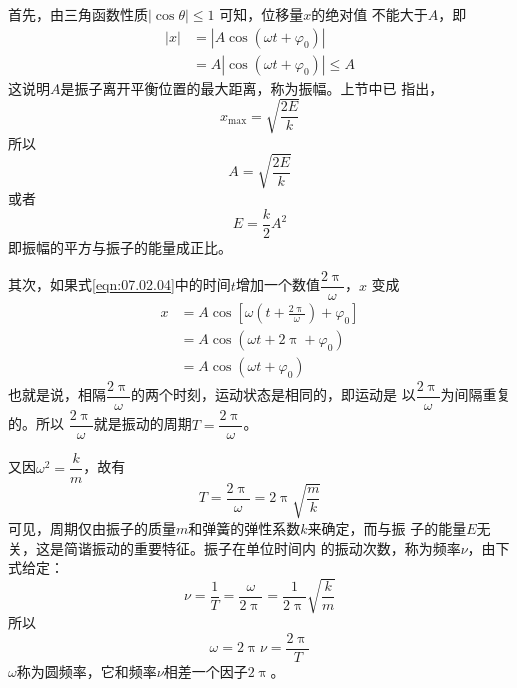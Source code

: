 \documentclass[../outline-of-mechanics.tex]{subfiles}
\begin{document}
首先，由三角函数性质$ \left| \cos \theta \right| \leqslant 1 $ 可知，位移量$ x $的绝对值
不能大于$ A $，即
\begin{equation*}
  \begin{aligned}
    \left| x \right| & = \left| A \cos \left( \omega t + \varphi _ { 0 } \right) \right|             \\
                     & = A \left| \cos \left( \omega t + \varphi _ { 0 } \right) \right| \leqslant A
  \end{aligned}
\end{equation*}
这说明$ A $是振子离开平衡位置的最大距离，称为振幅。上节中已
指出，
\begin{equation*}
  x _ { \max } = \sqrt { \frac { 2 E } { k } }
\end{equation*}
所以%
\begin{equation*}
  A = \sqrt { \frac { 2 E } { k } }
\end{equation*}
或者%
\begin{equation}\label{eqn:07.02.05}
  E = \frac { k } { 2 } A ^ { 2 }
\end{equation}
即振幅的平方与振子的能量成正比。

其次，如果式\eqref{eqn:07.02.04}中的时间$ t $增加一个数值$ \dfrac { 2 \uppi } { \omega } $，$ x $
变成
\begin{equation*}
  \begin{aligned}
    x & = A \cos \left[ \omega \left( t + \frac { 2 \uppi } { \omega } \right) + \varphi _ { 0 } \right] \\
      & = A \cos \left( \omega t + 2 \uppi + \varphi _ { 0 } \right)                                     \\
      & = A \cos \left( \omega t + \varphi _ { 0 } \right)
  \end{aligned}
\end{equation*}
也就是说，相隔$ \dfrac { 2 \uppi } { \omega } $的两个时刻，运动状态是相同的，即运动是
以$ \dfrac { 2 \uppi } { \omega } $为间隔重复的。所以 $ \dfrac { 2 \uppi } { \omega } $就是振动的周期$ T = \dfrac { 2 \uppi } { \omega } $。

又因$ \omega ^ { 2 } = \dfrac { k } { m } $，故有
\begin{equation}\label{eqn:07.02.06}
  T = \frac { 2 \uppi } { \omega } = 2 \uppi \sqrt { \frac { m } { k } }
\end{equation}
可见，周期仅由振子的质量$ m $和弹簧的弹性系数$ k $来确定，而与振
子的能量$ E $无关，这是简谐振动的重要特征。振子在单位时间内
的振动次数，称为频率$ \nu $，由下式给定：
\begin{equation*}
  \nu = \frac { 1 } { T } = \frac { \omega } { 2 \uppi } = \frac { 1 } { 2 \uppi } \sqrt { \frac { k } { m } }
\end{equation*}
所以
\begin{equation*}
  \omega = 2 \uppi \nu = \frac { 2 \uppi } { T }
\end{equation*}
$ \omega $称为圆频率，它和频率$ \nu $相差一个因子$ 2 \uppi $。
\end{document}

